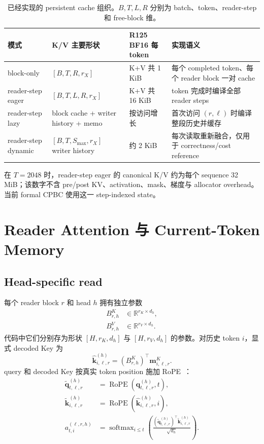 \documentclass[UTF8,twocolumn,10pt,a4paper]{ctexart}
\newcommand{\softmax}{\operatorname{softmax}}
\newcommand{\CPBC}{\textsf{CPBC}}
\begin{document}
\begin{table}[t]
\centering
\caption{已经实现的 persistent cache 组织。$B,T,L,R$ 分别为 batch、token、reader-step 和 free-block 维。}
\label{tab:cache-modes}
\small
\begin{tabularx}{\textwidth}{l l l Y}
\toprule
模式 & K/V 主要形状 & R125 BF16 每 token & 实现语义 \\
\midrule
block-only & $[B,T,R,r_X]$ & K+V 共 1 KiB & 每个 completed token、每个 reader block 一对 cache \\
reader-step eager & $[B,T,L,R,r_X]$ & K+V 共 16 KiB & token 完成时编译全部 reader steps \\
reader-step lazy & block cache + writer history + memo & 按访问增长 & 首次访问 $(r,\ell)$ 时编译整段历史并缓存 \\
reader-step dynamic & $[B,T,S_{\max},r_X]$ writer history & 约 2 KiB & 每次读取重新融合，仅用于 correctness/cost reference \\
\bottomrule
\end{tabularx}
\end{table}

在 $T=2048$ 时，reader-step eager 的 canonical K/V 约为每个 sequence 32 MiB；该数字不含 pre/post KV、activation、mask、梯度与 allocator overhead。当前 formal \CPBC{} 使用这一 step-indexed state。

\section{Reader Attention 与 Current-Token Memory}
\subsection{Head-specific read}
每个 reader block $r$ 和 head $h$ 拥有独立参数
\begin{align}
  B^K_{r,h}&\in\mathbb R^{r_K\times d_h},\\
  B^V_{r,h}&\in\mathbb R^{r_V\times d_h}.
\end{align}
代码中它们分别存为形状 $[H,r_K,d_h]$ 与 $[H,r_V,d_h]$ 的参数。对历史 token $i$，显式 decoded Key 为
\begin{equation}
  \widehat{\bm k}_{i,\ell,r}^{(h)}
  =(B^K_{r,h})^\top\bm m^K_{i,\ell,r}.
\end{equation}
query 和 decoded Key 按真实 token position 施加 RoPE~\cite{su2021roformer}：
\begin{align}
  \widetilde{\bm q}_{t,\ell,r}^{(h)}
  &=\operatorname{RoPE}(\bm q_{t,\ell,r}^{(h)},t),\\
  \widetilde{\bm k}_{i,\ell,r}^{(h)}
  &=\operatorname{RoPE}(\widehat{\bm k}_{i,\ell,r}^{(h)},i),\\
  a_{t,i}^{(\ell,r,h)}
  &=\softmax_{i\le t}
  \left(\frac{(\widetilde{\bm q}_{t,\ell,r}^{(h)})^\top
  \widetilde{\bm k}_{i,\ell,r}^{(h)}}{\sqrt{d_h}}\right).
  \label{eq:reader-attn}
\end{align}
\end{document}
